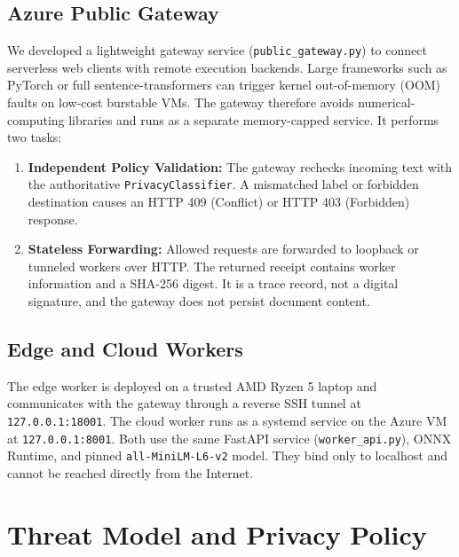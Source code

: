 \documentclass[conference]{IEEEtran}
\begin{document}
\subsection{Azure Public Gateway}
We developed a lightweight gateway service (\texttt{public\_gateway.py}) to connect serverless web clients with remote execution backends.
Large frameworks such as PyTorch or full sentence-transformers can trigger kernel out-of-memory (OOM) faults on low-cost burstable VMs.
The gateway therefore avoids numerical-computing libraries and runs as a separate memory-capped service.
It performs two tasks:
\begin{enumerate}
  \item \textbf{Independent Policy Validation:} The gateway rechecks incoming text with the authoritative \texttt{PrivacyClassifier}. A mismatched label or forbidden destination causes an HTTP 409 (Conflict) or HTTP 403 (Forbidden) response.
  \item \textbf{Stateless Forwarding:} Allowed requests are forwarded to loopback or tunneled workers over HTTP. The returned receipt contains worker information and a SHA-256 digest. It is a trace record, not a digital signature, and the gateway does not persist document content.
\end{enumerate}

\subsection{Edge and Cloud Workers}
The edge worker is deployed on a trusted AMD Ryzen 5 laptop and communicates with the gateway through a reverse SSH tunnel at \texttt{127.0.0.1:18001}.
The cloud worker runs as a systemd service on the Azure VM at \texttt{127.0.0.1:8001}.
Both use the same FastAPI service (\texttt{worker\_api.py}), ONNX Runtime, and pinned \texttt{all-MiniLM-L6-v2} model.
They bind only to localhost and cannot be reached directly from the Internet.
\section{Threat Model and Privacy Policy}
\end{document}

